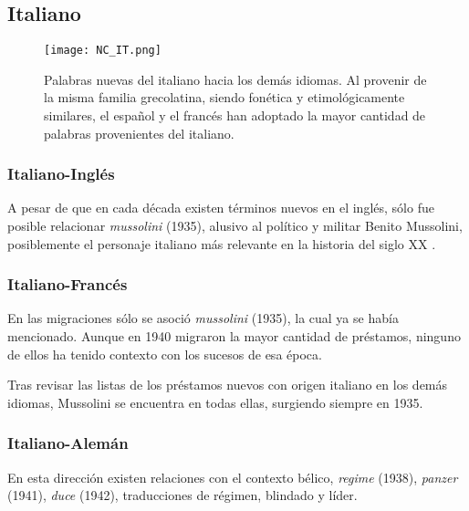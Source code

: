 \subsection{Italiano}%

\begin{figure}[h!]
	\centering
	\texttt{[image: NC\_IT.png]}
	\label{fig.NC_IT}
	\caption{Palabras nuevas del italiano hacia los demás idiomas. Al provenir de la misma familia grecolatina, siendo fonética y etimológicamente similares, el español y el francés han adoptado la mayor cantidad de palabras provenientes del italiano.} 
\end{figure}




\subsubsection*{Italiano-Inglés}%

A pesar de que en cada década existen términos nuevos en el inglés, sólo fue posible relacionar \textit{mussolini} (1935),  alusivo al político y militar Benito Mussolini, posiblemente el personaje italiano más relevante en la historia del siglo XX .

\subsubsection*{Italiano-Francés}%



En las migraciones sólo se asoció \textit{mussolini} (1935), la cual ya se había mencionado. Aunque en 1940 migraron la mayor cantidad de préstamos, ninguno de ellos ha tenido contexto con los sucesos de esa época. 

Tras revisar las listas de los préstamos nuevos con origen italiano  en los demás idiomas, Mussolini se encuentra en todas ellas, surgiendo siempre en 1935.





\subsubsection*{Italiano-Alemán}%

En esta dirección existen relaciones con el contexto bélico,  \textit{regime} (1938), \textit{panzer} (1941), \textit{duce} (1942),  traducciones de régimen, blindado y líder.




